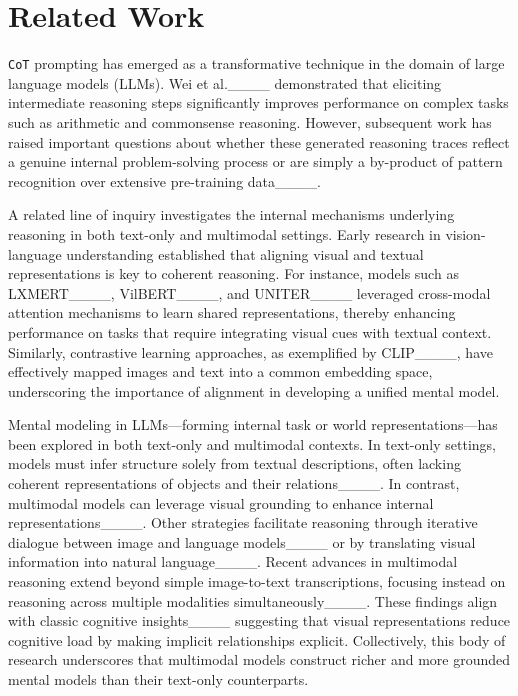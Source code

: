 \section{Related Work}
\texttt{CoT} prompting has emerged as a transformative technique in the domain of large language models (LLMs). Wei et al.____ demonstrated that eliciting intermediate reasoning steps significantly improves performance on complex tasks such as arithmetic and commonsense reasoning. However, subsequent work has raised important questions about whether these generated reasoning traces reflect a genuine internal problem-solving process or are simply a by-product of pattern recognition over extensive pre-training data____.

A related line of inquiry investigates the internal mechanisms underlying reasoning in both text-only and multimodal settings. Early research in vision-language understanding established that aligning visual and textual representations is key to coherent reasoning. For instance, models such as LXMERT____, VilBERT____, and UNITER____ leveraged cross-modal attention mechanisms to learn shared representations, thereby enhancing performance on tasks that require integrating visual cues with textual context. Similarly, contrastive learning approaches, as exemplified by CLIP____, have effectively mapped images and text into a common embedding space, underscoring the importance of alignment in developing a unified mental model.

Mental modeling in LLMs—forming internal task or world representations—has been explored in both text-only and multimodal contexts. In text-only settings, models must infer structure solely from textual descriptions, often lacking coherent representations of objects and their relations____. In contrast, multimodal models can leverage visual grounding to enhance internal representations____. Other strategies facilitate reasoning through iterative dialogue between image and language models____ or by translating visual information into natural language____. Recent advances in multimodal reasoning extend beyond simple image-to-text transcriptions, focusing instead on reasoning across multiple modalities simultaneously____. 
These findings align with classic cognitive insights____ suggesting that visual representations reduce cognitive load by making implicit relationships explicit. Collectively, this body of research underscores that multimodal models construct richer and more grounded mental models than their text-only counterparts.


